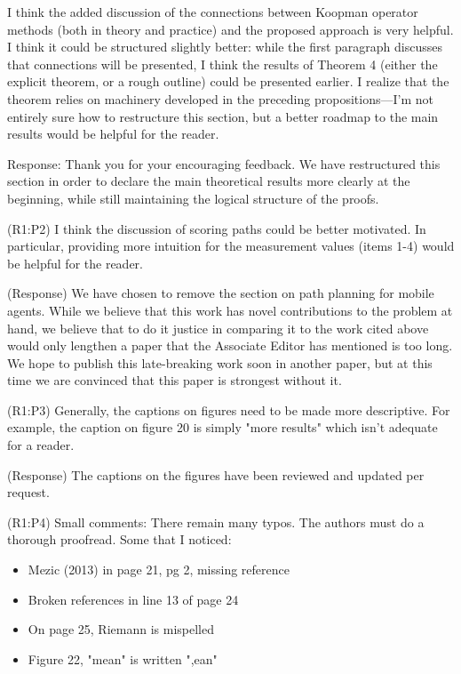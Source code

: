 \documentclass{letter}
\begin{document}
I think the added discussion of the connections between Koopman operator methods (both in theory and practice) and the proposed approach is very helpful. I think it could be structured slightly better: while the first paragraph discusses that connections will be presented, I think the results of Theorem 4 (either the explicit theorem, or a rough outline) could be presented earlier. I realize that the theorem relies on machinery developed in the preceding propositions---I'm not entirely sure how to restructure this section, but a better roadmap to the main results would be helpful for the reader. 

{\color{red} Response:} Thank you for your encouraging feedback. We have restructured this section in order to declare the main theoretical results more clearly at the beginning, while still maintaining the logical structure of the proofs.


{\color{red}(R1:P2)} I think the discussion of scoring paths could be better motivated. In particular, providing more intuition for the measurement values (items 1-4) would be helpful for the reader. 

{\color{red}(Response)} We have chosen to remove the section on path planning for mobile agents. While we believe that this work has novel contributions to the problem at hand, we believe that to do it justice in comparing it to the work cited above would only lengthen a paper that the Associate Editor has mentioned is too long. We hope to publish this late-breaking work soon in another paper, but at this time we are convinced that this paper is strongest without it.

{\color{red}(R1:P3)} Generally, the captions on figures need to be made more descriptive. For example, the caption on figure 20 is simply "more results" which isn't adequate for a reader. 

{\color{red}(Response)} The captions on the figures have been reviewed and updated per request.

{\color{red}(R1:P4)} Small comments: There remain many typos. The authors must do a thorough proofread. Some that I noticed:
\begin{itemize}
	\item Mezic (2013) in page 21, pg 2, missing reference 
	\item Broken references in line 13 of page 24
	\item On page 25, Riemann is mispelled
	\item Figure 22, "mean" is written ",ean"
\end{itemize}
\end{document}

